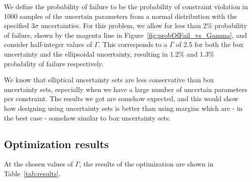 We define the probability of failure to be the probability of constraint violation in
1000 samples of the uncertain parameters from a normal distribution with the specified $3\sigma$ uncertainties.
For this problem, we allow for less than 2\% probability of failure, shown by the magenta line in
Figure~\ref{fig:probOfFail_vs_Gamma}, and consider half-integer values of $\Gamma$.
This corresponds to a $\Gamma$ of 2.5 for both the box uncertainty and the ellipsoidal uncertainty,
resulting in 1.2\% and 1.3\% probability of failure respectively.

We know that elliptical uncertainty sets are less conservative than box uncertainty sets,
especially when we have a large number of uncertain parameters per constraint.
The results we got are somehow expected, and this would show how designing using uncertainty
sets is better than using margins which are - in the best case - somehow similar to box uncertainty sets.

\subsection{Optimization results}

At the chosen values of $\Gamma$, the results of the optimization are shown in Table~\ref{tab:results}.

